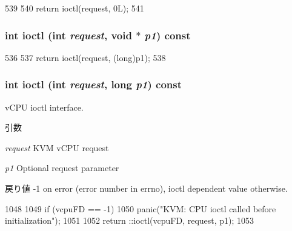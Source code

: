\begin{DoxyCode}
539                                  {
540         return ioctl(request, 0L);
541     }
\end{DoxyCode}
\hypertarget{group__KvmIoctl_ga89db87cb31fe2ba732de8fa68c8bd1f1}{
\subsubsection[{ioctl}]{\setlength{\rightskip}{0pt plus 5cm}int ioctl (int {\em request}, \/  void $\ast$ {\em p1}) const}}
\label{group__KvmIoctl_ga89db87cb31fe2ba732de8fa68c8bd1f1}



\begin{DoxyCode}
536                                            {
537         return ioctl(request, (long)p1);
538     }
\end{DoxyCode}
\hypertarget{group__KvmIoctl_ga106fe09b5e87d6c14884f8ffff7b338a}{
\subsubsection[{ioctl}]{\setlength{\rightskip}{0pt plus 5cm}int ioctl (int {\em request}, \/  long {\em p1}) const}}
\label{group__KvmIoctl_ga106fe09b5e87d6c14884f8ffff7b338a}
vCPU ioctl interface.


\begin{DoxyParams}{引数}
\item[{\em request}]KVM vCPU request \item[{\em p1}]Optional request parameter\end{DoxyParams}
\begin{DoxyReturn}{戻り値}
-\/1 on error (error number in errno), ioctl dependent value otherwise. 
\end{DoxyReturn}



\begin{DoxyCode}
1048 {
1049     if (vcpuFD == -1)
1050         panic("KVM: CPU ioctl called before initialization\n");
1051 
1052     return ::ioctl(vcpuFD, request, p1);
1053 }
\end{DoxyCode}
